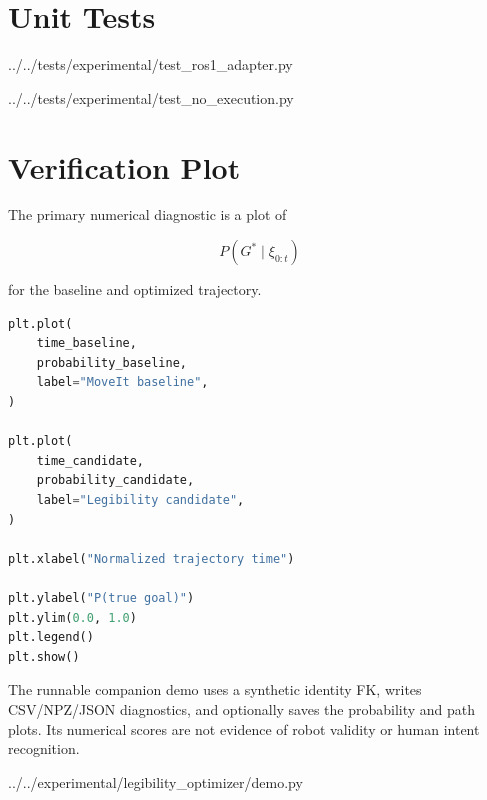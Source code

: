 \documentclass[11pt]{article}
\begin{document}




\section{Unit Tests}




{../../tests/experimental/test_ros1_adapter.py}


{../../tests/experimental/test_no_execution.py}

\section{Verification Plot}

The primary numerical diagnostic is a plot of

\[
P(G^*\mid\xi_{0:t})
\]

for the baseline and optimized trajectory.

\begin{lstlisting}[language=Python]
plt.plot(
    time_baseline,
    probability_baseline,
    label="MoveIt baseline",
)

plt.plot(
    time_candidate,
    probability_candidate,
    label="Legibility candidate",
)

plt.xlabel("Normalized trajectory time")

plt.ylabel("P(true goal)")
plt.ylim(0.0, 1.0)
plt.legend()
plt.show()
\end{lstlisting}

The runnable companion demo uses a synthetic identity FK, writes CSV/NPZ/JSON
diagnostics, and optionally saves the probability and path plots. Its numerical
scores are not evidence of robot validity or human intent recognition.

{../../experimental/legibility_optimizer/demo.py}
\end{document}
